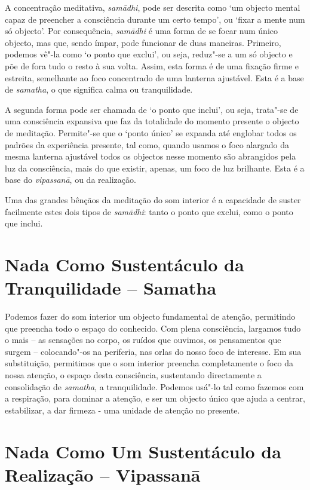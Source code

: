 A concentração meditativa, \emph{samādhi}, pode ser descrita como `um
objecto mental capaz de preencher a consciência durante um certo tempo',
ou `fixar a mente num só objecto'. Por consequência, \emph{samādhi} é
uma forma de se focar num único objecto, mas que, sendo ímpar, pode
funcionar de duas maneiras. Primeiro, podemos vê"-la como `o ponto que
exclui', ou seja, reduz"-se a um só objecto e põe de fora tudo o resto à
sua volta. Assim, esta forma é de uma fixação firme e estreita,
semelhante ao foco concentrado de uma lanterna ajustável. Esta é a base
de \emph{samatha}, o que significa calma ou tranquilidade.

A segunda forma pode ser chamada de `o ponto que inclui', ou seja,
trata"-se de uma consciência expansiva que faz da totalidade do momento
presente o objecto de meditação. Permite"-se que o `ponto único' se
expanda até englobar todos os padrões da experiência presente, tal como,
quando usamos o foco alargado da mesma lanterna ajustável todos os
objectos nesse momento são abrangidos pela luz da consciência, mais do
que existir, apenas, um foco de luz brilhante. Esta é a base do
\emph{vipassanā}, ou da realização.

Uma das grandes bênçãos da meditação do som interior é a capacidade de
suster facilmente estes dois tipos de \emph{samādhi}: tanto o ponto que
exclui, como o ponto que inclui.

\section{Nada Como Sustentáculo da Tranquilidade -- Samatha}

Podemos fazer do som interior um objecto fundamental de atenção,
permitindo que preencha todo o espaço do conhecido. Com plena
consciência, largamos tudo o mais -- as sensações no corpo, os ruídos
que ouvimos, os pensamentos que surgem -- colocando"-os na periferia, nas
orlas do nosso foco de interesse. Em sua substituição, permitimos que o
som interior preencha completamente o foco da nossa atenção, o espaço
desta consciência, sustentando directamente a consolidação de
\emph{samatha}, a tranquilidade. Podemos usá"-lo tal como fazemos com a
respiração, para dominar a atenção, e ser um objecto único que ajuda a
centrar, estabilizar, a dar firmeza - uma unidade de atenção no
presente.

\section{Nada Como Um Sustentáculo da Realização -- Vipassanā}

